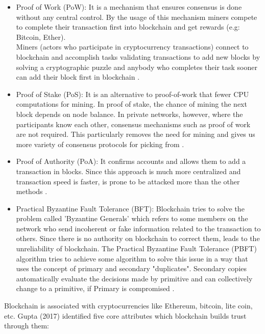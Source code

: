 \begin{itemize}
    \item Proof of Work (PoW): 
    It is a mechanism that ensures consensus is done without any central control. By the usage of this mechanism miners compete to complete their transaction first into blockchain and get rewards (e.g: Bitcoin, Ether).\\
    Miners (actors who participate in cryptocurrency transactions) connect to blockchain and accomplish tasks validating transactions to add new blocks by solving a cryptographic puzzle and anybody who completes their task sooner can add their block first in blockchain \cite{Pablo}.
    \item Proof of Stake (PoS): 
    It is an alternative to proof-of-work that fewer CPU computations for mining. In proof of stake, the chance of mining the next block depends on node balance. 
    In private networks, however, where the participants know each other, consensus mechanisms such as proof of work are not required. This particularly removes the need for mining and gives us more variety of consensus protocols for picking from \cite{Christidis}.
    \item Proof of Authority (PoA): It confirms accounts and allows them to add a transaction in blocks. Since this approach is much more centralized and transaction speed is faster, is prone to be attacked more than the other methods \cite{Luke}.
    \item Practical Byzantine Fault Tolerance (BFT): Blockchain tries to solve the problem called 'Byzantine Generals' which refers to some members on the network who send incoherent or fake information related to the transaction to others. Since there is no authority on blockchain to correct them, leads to the unreliability of blockchain. The Practical Byzantine Fault Tolerance (PBFT) algorithm tries to achieve some algorithm to solve this issue in a way that uses the concept of primary and secondary "duplicates". Secondary copies automatically evaluate the decisions made by primitive and can collectively change to a primitive, if Primary is compromised \cite{Luke}.
\end{itemize}
Blockchain is associated with cryptocurrencies like Ethereum, bitcoin, lite coin, etc. Gupta (2017) \cite{Gupta} identified five core attributes which blockchain builds trust through them:
